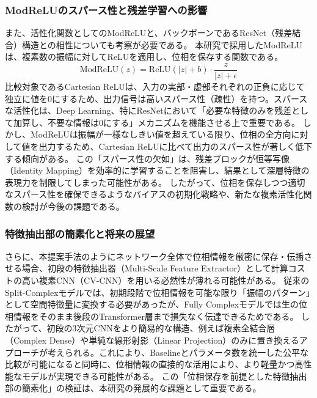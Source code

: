 \subsubsection{ModReLUのスパース性と残差学習への影響}
また、活性化関数としてのModReLUと、バックボーンであるResNet（残差結合）構造との相性についても考察が必要である。
本研究で採用したModReLUは、複素数の振幅に対してReLUを適用し、位相を保存する関数である。
\begin{equation}
 \text{ModReLU}(z) = \text{ReLU}(|z| + b) \cdot \frac{z}{|z| + \epsilon}
\end{equation}
比較対象であるCartesian ReLUは、入力の実部・虚部それぞれの正負に応じて独立に値を0にするため、出力信号は高いスパース性（疎性）を持つ。スパースな活性化は、Deep Learning、特にResNetにおいて「必要な特徴のみを残差として加算し、不要な情報は0にする」メカニズムを機能させる上で重要である。
しかし、ModReLUは振幅が一様なしきい値を超えている限り、位相の全方向に対して値を出力するため、Cartesian ReLUに比べて出力のスパース性が著しく低下する傾向がある。
この「スパース性の欠如」は、残差ブロックが恒等写像（Identity Mapping）を効率的に学習することを阻害し、結果として深層特徴の表現力を制限してしまった可能性がある。
したがって、位相を保存しつつ適切なスパース性を確保できるようなバイアスの初期化戦略や、新たな複素活性化関数の検討が今後の課題である。

\subsubsection{特徴抽出部の簡素化と将来の展望}
さらに、本提案手法のようにネットワーク全体で位相情報を厳密に保存・伝播させる場合、初段の特徴抽出器（Multi-Scale Feature Extractor）として計算コストの高い複素CNN（CV-CNN）を用いる必然性が薄れる可能性がある。
従来のSplit-Complexモデルでは、初期段階で位相情報を可能な限り「振幅のパターン」として空間特徴量に変換する必要があったが、Fully Complexモデルでは生の位相情報をそのまま後段のTransformer層まで損失なく伝達できるためである。
したがって、初段の3次元CNNをより簡易的な構造、例えば複素全結合層（Complex Dense）や単純な線形射影（Linear Projection）のみに置き換えるアプローチが考えられる。これにより、Baselineとパラメータ数を統一した公平な比較が可能になると同時に、位相情報の直接的な活用により、より軽量かつ高性能なモデルが実現できる可能性がある。
この「位相保存を前提とした特徴抽出部の簡素化」の検証は、本研究の発展的な課題として重要である。